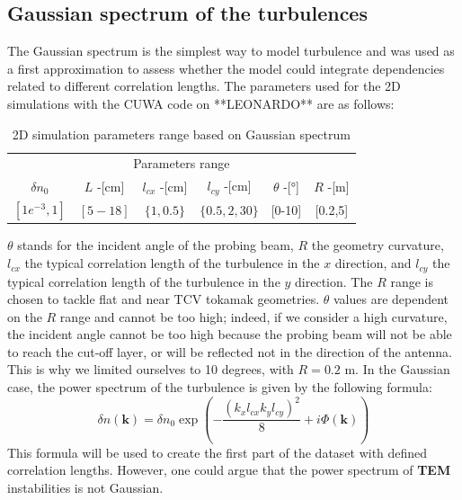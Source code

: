 \documentclass[11pt,a4paper,openany]{report}
\begin{document}
\begin{multicols}{2}
    \subsection{Gaussian spectrum of the turbulences}
    The Gaussian spectrum is the simplest way to model turbulence and was used as a first approximation to assess whether the model could integrate dependencies related to different correlation lengths. The parameters used for the 2D simulations with the CUWA code on **LEONARDO** are as follows:
    \setlength{\tabcolsep}{.008\linewidth}
    \begin{table}
        \begin{tabular}{c|c|c|c|c|c}
            \toprule
            \multicolumn{6}{c}{Parameters range}                                                     \\
            \cmidrule{1 -6}
            $\delta n_0$   & $L$ -[cm] & $l_{cx}$ -[cm] & $l_{cy}$ -[cm]  & $\theta$ -[°] & $R$ -[m] \\
            \midrule
            $[1e^{-3}, 1]$ & $[5-18]$  & $\{1, 0.5 \}$  & $\{0.5,2,30 \}$ & [0-10]        & [0.2,5]  \\
            \bottomrule
        \end{tabular}
        \caption{2D simulation parameters range based on Gaussian spectrum}
        \label{Gaussian_table}
    \end{table}

    $\theta$ stands for the incident angle of the probing beam, $R$ the geometry curvature, $l_{cx}$ the typical correlation length of the turbulence in the $x$ direction, and $l_{cy}$ the typical correlation length of the turbulence in the $y$ direction. The $R$ range is chosen to tackle flat and near TCV tokamak geometries. $\theta$ values are dependent on the $R$ range and cannot be too high; indeed, if we consider a high curvature, the incident angle cannot be too high because the probing beam will not be able to reach the cut-off layer, or will be reflected not in the direction of the antenna. This is why we limited ourselves to 10 degrees, with $R = 0.2$ m. In the Gaussian case, the power spectrum of the turbulence is given by the following formula:
    $$
        \delta n(\textbf{k} ) = \delta n_0 \exp\left(-\frac{(k_x l_{cx} k_y l_{cy})^2}{8} + i\Phi(\textbf{k} )\right)
    $$
    This formula will be used to create the first part of the dataset with defined correlation lengths. However, one could argue that the power spectrum of \textbf{TEM} instabilities is not Gaussian.


\end{multicols}
\end{document}
